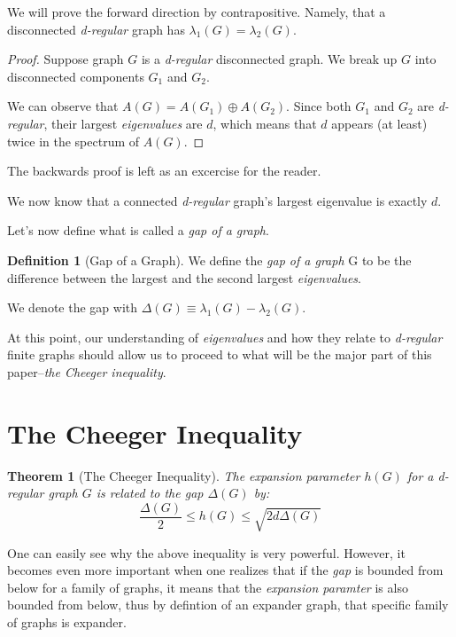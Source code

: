 \documentclass{article}
\theoremstyle{theorem}
\newtheorem{theorem}{Theorem}[section]
\theoremstyle{definition}
\newtheorem{definition}{Definition}[section]
\theoremstyle{example}
\theoremstyle{proposition}
\begin{document}
        We will prove the forward direction by contrapositive. Namely, that a disconnected \textit{d-regular} graph has $\lambda_1(G) = \lambda_2(G)$.

        \begin{proof}
            Suppose graph $G$ is a \textit{d-regular} disconnected graph. We break up $G$ into disconnected components $G_1$ and $G_2$.

            We can observe that $A(G) = A(G_1) \oplus A(G_2)$. Since both $G_1$ and $G_2$ are \textit{d-regular}, their largest \textit{eigenvalues} are $d$, which means that $d$ appears (at least) twice in the spectrum of $A(G)$.
        \end{proof}
        The backwards proof is left as an excercise for the reader.

        We now know that a connected \textit{d-regular} graph's largest eigenvalue is exactly $d$.
         
        Let's now define what is called a \textit{gap of a graph}.

        \begin{definition}[Gap of a Graph]
            We define the \textit{gap of a graph} G to be the difference between the largest and the second largest \textit{eigenvalues}.

            We denote the gap with $\Delta(G) \equiv \lambda_1(G) - \lambda_2(G)$.
        \end{definition}

        At this point, our understanding of \textit{eigenvalues} and how they relate to \textit{d-regular} finite graphs should allow us to proceed to what will be the major part of this paper--\textit{the Cheeger inequality}.
        \newpage

        \section{The Cheeger Inequality}
        \begin{theorem}[The Cheeger Inequality]
            The expansion parameter $h(G)$ for a \textit{d-regular} graph $G$ is related to the gap $\Delta(G)$ by:
            \[\frac{\Delta(G)}{2} \leq h(G) \leq \sqrt{2d\Delta(G)}\]
        \end{theorem}

        One can easily see why the above inequality is very powerful. However, it becomes even more important when one realizes that if the \textit{gap} is bounded from below for a family of graphs, it means that the \textit{expansion paramter} is also bounded from below, thus by defintion of an expander graph, that specific family of graphs is expander.
\end{document}
